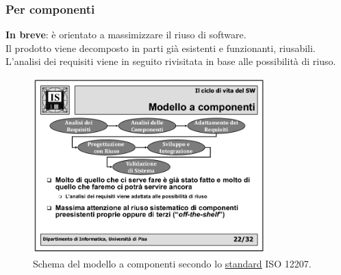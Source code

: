 			\subsubsection{Per componenti} 
			\textbf{In breve}: è orientato a massimizzare il riuso di software. \\
			Il prodotto viene decomposto in parti già esistenti e funzionanti, riusabili. L'analisi dei requisiti viene in seguito rivisitata in base alle possibilità di riuso.
			\begin{figure}[H]
				\centering
				\includegraphics[width=0.8\textwidth]{img/acomponenti}
				\caption{Schema del modello a componenti secondo lo \underline{\hyperref[standard]{standard}} ISO 12207.}
			\end{figure}

